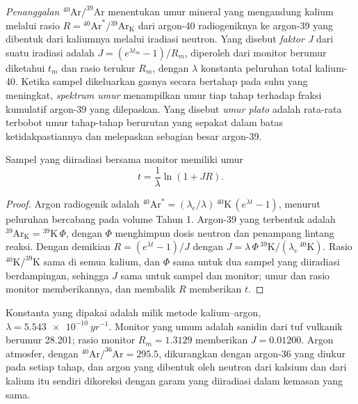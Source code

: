 \begin{definition}
\label{def:b3:advanced-geochronology:arar}
\emph{Penanggalan $^{40}\mathrm{Ar}/^{39}\mathrm{Ar}$}
menentukan umur mineral yang mengandung kalium melalui rasio $R =
{}^{40}\mathrm{Ar}^*/{}^{39}\mathrm{Ar}_{\mathrm K}$ dari argon-40 radiogeniknya
ke argon-39 yang dibentuk dari kaliumnya melalui iradiasi neutron. Yang disebut
\emph{faktor J} dari suatu iradiasi adalah $J = (e^{\lambda
t_m} - 1)/R_m$, diperoleh dari monitor berumur diketahui $t_m$ dan rasio terukur
$R_m$, dengan $\lambda$ konstanta peluruhan total kalium-40. Ketika sampel
dikeluarkan gasnya secara bertahap pada suhu yang meningkat, \emph{spektrum
umur} menampilkan umur tiap tahap terhadap
fraksi kumulatif argon-39 yang dilepaskan. Yang disebut \emph{umur
plato} adalah rata-rata terbobot umur tahap-tahap berurutan yang
sepakat dalam batas ketidakpastiannya dan melepaskan sebagian besar argon-39.
\end{definition}

\begin{theorem}\label{thm:b3:advanced-geochronology:arar}
Sampel yang diiradiasi bersama monitor memiliki umur
\[
t = \frac1\lambda\ln(1 + JR).
\]
\end{theorem}

\begin{proof}
Argon radiogenik adalah $^{40}\mathrm{Ar}^* = (\lambda_e/\lambda)\,
{}^{40}\mathrm{K}\,(e^{\lambda t} - 1)$, menurut peluruhan bercabang pada
volume Tahun 1. Argon-39 yang terbentuk adalah $^{39}\mathrm{Ar}_{\mathrm K} =
{}^{39}\mathrm{K}\,\Phi$, dengan $\Phi$ menghimpun dosis neutron dan
penampang lintang reaksi. Dengan demikian $R = (e^{\lambda t} - 1)/J$ dengan $J =
\lambda\,\Phi\,{}^{39}\mathrm{K}/(\lambda_e\,{}^{40}\mathrm{K})$. Rasio
$^{40}\mathrm{K}/^{39}\mathrm{K}$ sama di semua kalium, dan $\Phi$
sama untuk dua sampel yang diiradiasi berdampingan, sehingga $J$ sama untuk sampel
dan monitor; umur dan rasio monitor memberikannya, dan membalik $R$ memberikan
$t$.
\end{proof}

Konstanta yang dipakai adalah milik metode kalium--argon, $\lambda =
\qty{5.543e-10}{yr^{-1}}$. Monitor yang umum adalah sanidin dari tuf vulkanik
berumur \qty{28.201}{\Ma}; rasio monitor $R_m = 1.3129$ memberikan $J =
0.01200$. Argon atmosfer, dengan $^{40}\mathrm{Ar}/^{36}\mathrm{Ar} = 295.5$,
dikurangkan dengan argon-36 yang diukur pada setiap tahap, dan argon yang dibentuk oleh
neutron dari kalsium dan dari kalium itu sendiri dikoreksi dengan garam
yang diiradiasi dalam kemasan yang sama.

